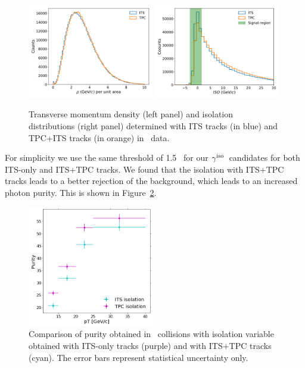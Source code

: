 \begin{figure}
	\center
	\includegraphics[width=0.49\textwidth]{Appendices/UEestimate_Skimmed_13def.pdf}
		\includegraphics[width=0.49\textwidth]{Appendices/IsolationTPC_Skimmed_13def.pdf}
	\caption{Transverse momentum density (left panel) and isolation distributions (right panel) determined with ITS tracks (in blue) and TPC+ITS tracks (in orange) in \pPb~data.}
	\label{fig:pPb_its_tpc_rho}
\end{figure}

For simplicity we use the same threshold of 1.5 \GeVc~for our $\gamma^\mathrm{iso}$~candidates for both ITS-only and ITS+TPC tracks. We found that the isolation with ITS+TPC tracks leads to a better rejection of the background, which leads to an increased photon purity. This is shown in Figure~\ref{fig:ComparisonTPCITSiso_purity}. 

\begin{figure}
	\center
	\includegraphics[width=0.49\textwidth]{Appendices/PurityITSTPC.png}
	\caption{Comparison of purity obtained in \pPb~collisions with isolation variable obtained with ITS-only tracks (purple) and with ITS+TPC tracks (cyan). The error bars represent statistical uncertainty only. }
	\label{fig:ComparisonTPCITSiso_purity}
\end{figure}

